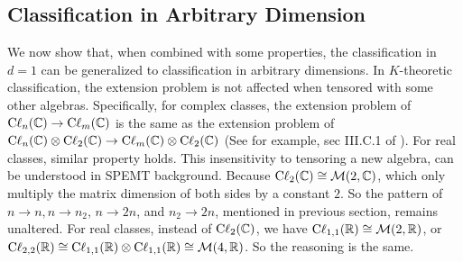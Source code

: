 \subsection{Classification in Arbitrary Dimension}
\label{sec:Classification in Arbitrary Dimension}
We now show that, when combined with some properties, the classification in $d=1$ can be
generalized to classification in arbitrary dimensions. In $K$-theoretic
classification, the extension problem is not affected when tensored with some
other algebras. Specifically, for complex classes, the extension problem of
$\mathrm{C\ell}_{n}(\mathbb{C})\to\mathrm{C\ell}_{m}(\mathbb{C})$ is the same as the extension
problem of $\mathrm{C\ell}_{n}(\mathbb{C})\otimes\mathrm{C\ell}_{2}(\mathbb{C})\to
\mathrm{C\ell}_{m}(\mathbb{C})\otimes\mathrm{C\ell}_{2}(\mathbb{C})$ (See for example, sec
III.C.1 of \cite{Chiu2016}). For real classes, similar property holds.
This insensitivity to tensoring a new algebra, can be understood in SPEMT
background. Because $\mathrm{C\ell}_{2}(\mathbb{C})\cong\mathcal{M}(2,\mathbb{C})$, which only
multiply the matrix dimension of both sides by a constant $2$. So the pattern of
$n\to n, n\to n_2$, $n\to 2n$, and $n_2\to 2n$, mentioned in previous section,
remains unaltered. For real classes, instead of $\mathrm{C\ell}_{2}(\mathbb{C})$, we
have $\mathrm{C\ell}_{1,1}(\mathbb{R})\cong\mathcal{M}(2,\mathbb{R})$, or
$\mathrm{C\ell}_{2,2}(\mathbb{R})\cong\mathrm{C\ell}_{1,1}(\mathbb{R})\otimes\mathrm{C\ell}_{1,1}(\mathbb{R})\cong\mathcal{M}(4,\mathbb{R})$.
So the reasoning is the same.

